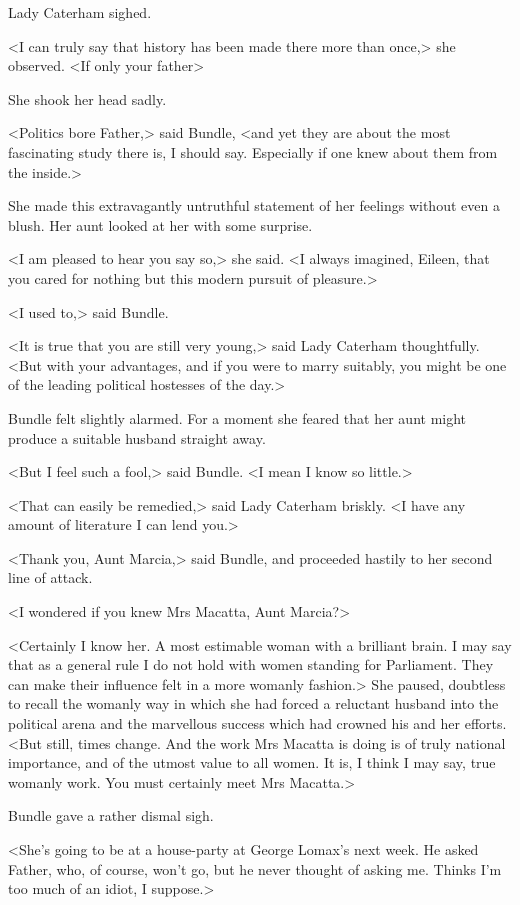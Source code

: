 Lady Caterham sighed.

<I can truly say that history has been made there more than once,> she observed. <If only your father\longdash>

She shook her head sadly.

<Politics bore Father,> said Bundle, <and yet they are about the most fascinating study there is, I should say. Especially if one knew about them from the inside.>

She made this extravagantly untruthful statement of her feelings without even a blush. Her aunt looked at her with some surprise.

<I am pleased to hear you say so,> she said. <I always imagined, Eileen, that you cared for nothing but this modern pursuit of pleasure.>

<I used to,> said Bundle.

<It is true that you are still very young,> said Lady Caterham thoughtfully. <But with your advantages, and if you were to marry suitably, you might be one of the leading political hostesses of the day.>

Bundle felt slightly alarmed. For a moment she feared that her aunt might produce a suitable husband straight away.

<But I feel such a fool,> said Bundle. <I mean I know so little.>

<That can easily be remedied,> said Lady Caterham briskly. <I have any amount of literature I can lend you.>

<Thank you, Aunt Marcia,> said Bundle, and proceeded hastily to her second line of attack.

<I wondered if you knew Mrs Macatta, Aunt Marcia?>

<Certainly I know her. A most estimable woman with a brilliant brain. I may say that as a general rule I do not hold with women standing for Parliament. They can make their influence felt in a more womanly fashion.> She paused, doubtless to recall the womanly way in which she had forced a reluctant husband into the political arena and the marvellous success which had crowned his and her efforts. <But still, times change. And the work Mrs Macatta is doing is of truly national importance, and of the utmost value to all women. It is, I think I may say, true womanly work. You must certainly meet Mrs Macatta.>

Bundle gave a rather dismal sigh.

<She's going to be at a house-party at George Lomax's next week. He asked Father, who, of course, won't go, but he never thought of asking me. Thinks I'm too much of an idiot, I suppose.>

